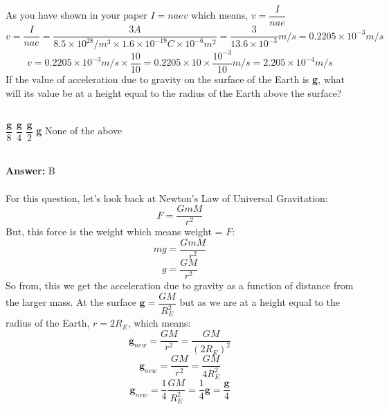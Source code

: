 \documentclass[11pt,addpoints]{exam}
\begin{document}
\begin{questions}
					As you have shown in your paper $I=naev$ which means, $v=\dfrac{I}{nae}$
					$$v=\dfrac{I}{nae}=\dfrac{3A}{8.5\times10^{28}/m^3\times1.6\times10^{-19}C\times10^{-6}m^2}=\dfrac{3}{13.6\times10^{-3}}m/s=0.2205\times10^{-3}m/s$$
					$$v=0.2205\times10^{-3}m/s\times\dfrac{10}{10}=0.2205\times10\times\dfrac{10^{-3}}{10}m/s=2.205\times10^{-4}m/s$$
					\question If the value of acceleration due to gravity on the surface of the Earth is \textbf{g}, what will its value be at a height equal to the radius of the Earth above the surface?\\ \\
					\begin{oneparchoices}
						\choice $\dfrac{\textbf{g}}{8}$
						\choice $\dfrac{\textbf{g}}{4}$
						\choice $\dfrac{\textbf{g}}{2}$
						\choice \textbf{g}
						\choice None of the above
					\end{oneparchoices}
					\\ \textbf{Answer:} B \\ \\
					For this question, let's look back at Newton's Law of Universal Gravitation:
					$$F=\dfrac{GmM}{r^2}$$
					But, this force is the weight which means weight = $F$:
					$$mg=\dfrac{GmM}{r^2}$$
					$$g=\dfrac{GM}{r^2}$$
					So from, this we get the acceleration due to gravity as a function of distance from the larger mass. At the surface $\textbf{g}=\dfrac{GM}{R_E^2}$ but as we are at a height equal to the radius of the Earth, $r=2R_E$, which means:
					$$\textbf{g}_{new}=\dfrac{GM}{r^2}=\dfrac{GM}{(2R_E)^2}$$ 
					$$\textbf{g}_{new}=\dfrac{GM}{r^2}=\dfrac{GM}{4R_E^2}$$
					$$\textbf{g}_{new}=\dfrac{1}{4}\dfrac{GM}{R_E^2}=\dfrac{1}{4}\textbf{g}=\dfrac{\textbf{g}}{4}$$
				\end{questions}
			
\end{document}
